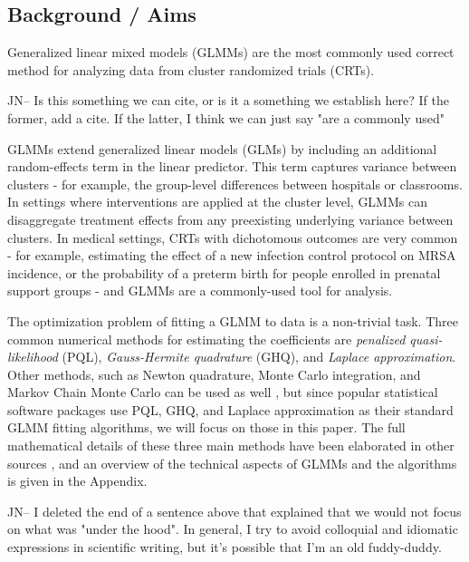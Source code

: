 \documentclass{article}
\begin{document}
\newpage

\begin{flushleft}
\section{Background / Aims}

Generalized linear mixed models (GLMMs) are the most commonly used correct method for analyzing data from cluster randomized trials (CRTs). 

JN-- Is this something we can cite, or is it a something we establish here?  If the former, add a cite.  If the latter, I think we can just say "are a commonly used"

GLMMs extend generalized linear models (GLMs) by including an additional random-effects term in the linear predictor. This term captures variance between clusters - for example, the group-level differences between hospitals or classrooms. In settings where interventions are applied at the cluster level, GLMMs can disaggregate treatment effects from any preexisting underlying variance between clusters. In medical settings, CRTs with dichotomous outcomes are very common - for example, estimating the effect of a new infection control protocol on MRSA incidence, or the probability of a preterm birth for people enrolled in prenatal support groups - and GLMMs are a commonly-used tool for analysis. 


The optimization problem of fitting a GLMM to data is a non-trivial task. Three common numerical methods for estimating the coefficients are \textit{penalized quasi-likelihood} (PQL), \textit{Gauss-Hermite quadrature} (GHQ), and \textit{Laplace approximation}. Other methods, such as Newton quadrature, Monte Carlo integration, and Markov Chain Monte Carlo can be used as well \cite{zhang_fitting_2011}, but since popular statistical software packages use PQL, GHQ, and Laplace approximation as their standard GLMM fitting algorithms, we will focus on those in this paper. The full mathematical details of these three main methods have been elaborated in other sources \cite{wolfinger_generalized_1993}\cite{pinheiro_efficient_2006}, and an overview of the technical aspects of GLMMs and the algorithms is given in the Appendix.

JN-- I deleted the end of a sentence above that explained that we would not focus on what was "under the hood".  In general, I try to avoid colloquial and idiomatic expressions in scientific writing, but it's possible that I'm an old fuddy-duddy.



\end{flushleft}
\end{document}
